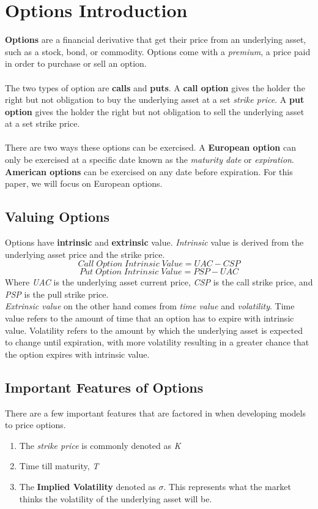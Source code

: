 \section{Options Introduction}
\textbf{Options} are a financial derivative that get their price from an underlying asset, such as a stock, bond, or commodity. Options come with a \textit{premium}, a price paid in order to purchase or sell an option.
\\
\\
The two types of option are \textbf{calls} and \textbf{puts}. A \textbf{call option} gives the holder the right but not obligation to buy the underlying asset at a set \textit{strike price}. A \textbf{put option} gives the holder the right but not obligation to sell the underlying asset at a set strike price. 
\\
\\
There are two ways these options can be exercised. A \textbf{European option} can only be exercised at a specific date known as the \textit{maturity date} or \textit{expiration}. \textbf{American options} can be exercised on any date before expiration. For this paper, we will focus on European options.

\subsection{Valuing Options}
Options have \textbf{intrinsic} and \textbf{extrinsic} value. \textit{Intrinsic} value is derived from the underlying asset price and the strike price. 
$$Call \; Option \; Intrinsic \; Value = UAC - CSP$$
$$Put \; Option \; Intrinsic \; Value = PSP - UAC$$
Where \textit{UAC} is the underlying asset current price, \textit{CSP} is the call strike price, and \textit{PSP} is the pull strike price. \\
\textit{Extrinsic value} on the other hand comes from \textit{time value} and \textit{volatility}. Time value refers to the amount of time that an option has to expire with intrinsic value. Volatility refers to the amount by which the underlying asset is expected to change until expiration, with more volatility resulting in a greater chance that the option expires with intrinsic value.\cite{OptionsIntro}


\subsection{Important Features of Options}
There are a few important features that are factored in when developing models to price options. 
\begin{enumerate}
    \item The \textit{strike price} is commonly denoted as \textit{K}
    \item Time till maturity, \textit{T}
    \item The \textbf{Implied Volatility} denoted as $\sigma$. This represents what the market thinks the volatility of the underlying asset will be. 
\end{enumerate}
